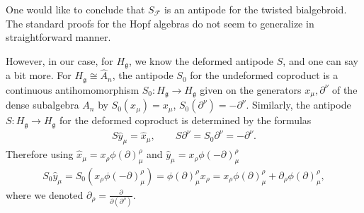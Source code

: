 \documentclass[10pt,a4paper]{amsart}
\def\gg{\mathfrak{g}}
\numberwithin{equation}{section}
\begin{document}
One would like to conclude that $S_{\mathcal{F}}$ is an antipode for the twisted bialgebroid. The standard proofs for the Hopf algebras do not seem to generalize in straightforward manner.

However, in our case, for $H_\gg$, we know the deformed antipode $S$, and one can say a bit more. For $H_\gg\cong\hat{A}_n$, the antipode $S_0$ for the undeformed coproduct is a continuous antihomomorphism $S_0\colon H_\gg\to H_\gg$ given on the generators $x_\mu,\partial^\nu$ of the dense subalgebra $A_n$ by $S_0(x_\mu)=x_\mu$, $S_0(\partial^\nu) = -\partial^\nu$. Similarly, the antipode $S\colon H_\gg\to H_\gg$ for the deformed coproduct is determined by the formulas
\begin{gather*}
S\hat{y}_\mu = \hat{x}_\mu,\qquad S\partial^\nu = S_0\partial^\nu = -\partial^\nu.
\end{gather*}
 Therefore using $\hat{x}_\mu = x_\rho \phi(\partial)^\rho_\mu$ and $\hat{y}_\mu = x_\rho \phi(-\partial)^\rho_\mu$
\begin{gather*}
S_0 \hat{y}_\mu = S_0(x_\rho \phi(-\partial)^\rho_\mu) = \phi(\partial)^\rho_\mu x_\rho = x_\rho\phi(\partial)^\rho_\mu + \partial_\rho\phi(\partial)^\rho_\mu,
\end{gather*}
where we denoted $\partial_\rho = \frac{\partial}{\partial(\partial^\rho)}$.
\end{document}
